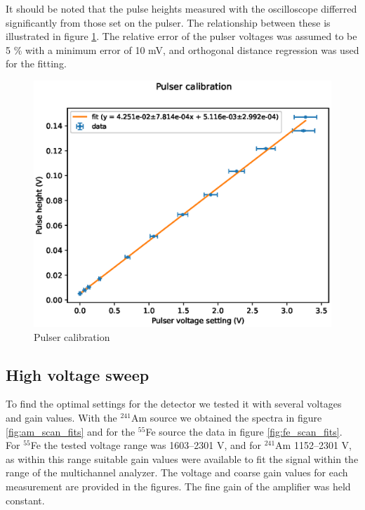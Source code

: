 \documentclass[a4paper]{article}
\begin{document}
It should be noted that the pulse heights measured with the oscilloscope differred significantly from those set on the pulser.
The relationship between these is illustrated in figure \ref{fig:pulser_calibration}.
The relative error of the pulser voltages was assumed to be 5 \% with a minimum error of 10 mV, and orthogonal distance regression was used for the fitting.

\begin{figure}[ht!]
\centering
\includegraphics[width=\textwidth]{fig/python/pulser_calibration.eps}
\caption{Pulser calibration}
\label{fig:pulser_calibration}
\end{figure}


\clearpage
\subsection{High voltage sweep}
\label{results_hv}
To find the optimal settings for the detector we tested it with several voltages and gain values.
With the $^{241}$Am source we obtained the spectra in figure \ref{fig:am_scan_fits} and for the $^{55}$Fe source the data in figure \ref{fig:fe_scan_fits}.
For $^{55}$Fe the tested voltage range was 1603--2301 V, and for $^{241}$Am 1152--2301 V, as within this range suitable gain values were available to fit the signal within the range of the multichannel analyzer.
The voltage and coarse gain values for each measurement are provided in the figures.
The fine gain of the amplifier was held constant.
\end{document}
